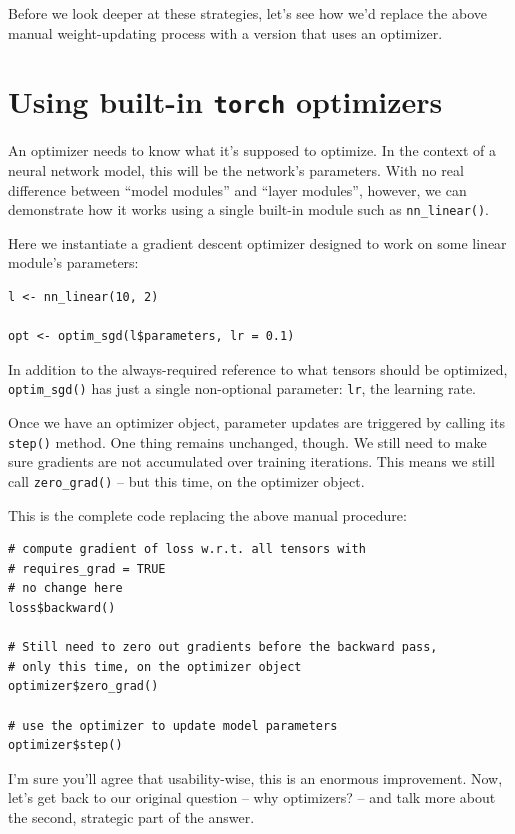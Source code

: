 \documentclass[
  letterpaper,
]{krantz}
\begin{document}
Before we look deeper at these strategies, let's see how we'd replace
the above manual weight-updating process with a version that uses an
optimizer.

\hypertarget{using-built-in-torch-optimizers}{%
\section{\texorpdfstring{Using built-in \texttt{torch}
optimizers}{Using built-in torch optimizers}}\label{using-built-in-torch-optimizers}}

An optimizer needs to know what it's supposed to optimize. In the
context of a neural network model, this will be the network's
parameters. With no real difference between ``model modules'' and
``layer modules'', however, we can demonstrate how it works using a
single built-in module such as \texttt{nn\_linear()}.

Here we instantiate a gradient descent
optimizer designed to work on some
linear module's parameters:

\begin{verbatim}
l <- nn_linear(10, 2)

opt <- optim_sgd(l$parameters, lr = 0.1)
\end{verbatim}

In addition to the always-required reference to what tensors should be
optimized, \texttt{optim\_sgd()} has just a single non-optional
parameter: \texttt{lr}, the learning rate.

Once we have an optimizer object, parameter updates are triggered by
calling its \texttt{step()} method. One thing remains unchanged, though.
We still need to make sure gradients are not accumulated over training
iterations. This means we still call \texttt{zero\_grad()} -- but this
time, on the optimizer object.

This is the complete code replacing the above manual procedure:

\begin{verbatim}
# compute gradient of loss w.r.t. all tensors with
# requires_grad = TRUE
# no change here
loss$backward()

# Still need to zero out gradients before the backward pass,
# only this time, on the optimizer object
optimizer$zero_grad()

# use the optimizer to update model parameters
optimizer$step()
\end{verbatim}

I'm sure you'll agree that usability-wise, this is an enormous
improvement. Now, let's get back to our original question -- why
optimizers? -- and talk more about the second, strategic part of the
answer.
\end{document}
